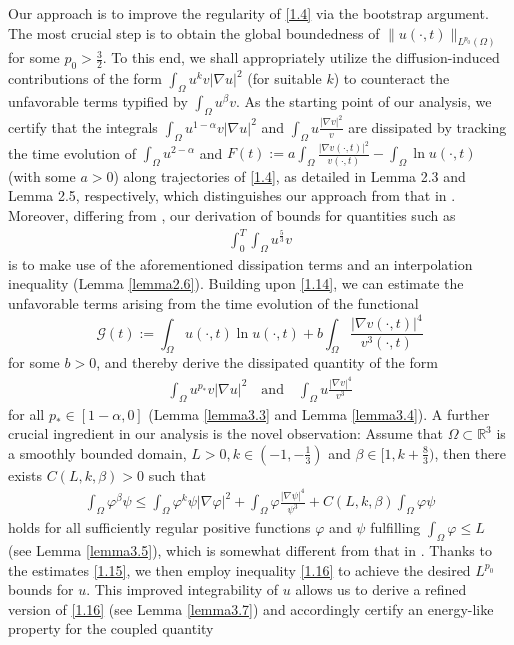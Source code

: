 \documentclass[12pt]{article}
\theoremstyle{plain}
\theoremstyle{definition}
\numberwithin{equation}{section}
\begin{document}
        Our approach is to improve the regularity of  \eqref{1.4} via the bootstrap argument. The most crucial step is to obtain the global boundedness of $\|u(\cdot,t)\|_{L^{p_0}(\Omega)}$ for some $p_0>\frac{3}{2}$. To this end,  we shall appropriately utilize the diffusion-induced contributions of the form $\int_{\Omega}u^{k}v|\nabla u|^2$ (for suitable $k$) to counteract the unfavorable terms typified by $\int_{\Omega}u^{\beta}v$.
    As the starting point of our analysis, we certify  that the integrals $\int_{\Omega}u^{1-\alpha}v|\nabla u|^2$ and $\int_{\Omega}u\frac{|\nabla v|^{2}}{v}$ are dissipated by tracking the
time evolution of $\int_{\Omega}u^{2-\alpha}$ and ${F}(t):=a\int_{\Omega} \frac{|\nabla v(\cdot,t)|^2}{v(\cdot,t)}-\int_{\Omega}\ln{u(\cdot,t)}$ (with some $a>0$) along trajectories of  \eqref{1.4}, as detailed in Lemma 2.3 and Lemma 2.5, respectively, which distinguishes our approach from that in \cite{LiG}. Moreover, differing from \cite{LiG,Wu}, our derivation of bounds for quantities such as
        \begin{align}\label{1.14}
        \int_0^{T}\int_\Omega u^{\frac{5}{3}}v
        \end{align}
         is to make use of the aforementioned dissipation terms
         and an interpolation inequality (Lemma \ref{lemma2.6}). Building upon \eqref{1.14}, we can estimate the
         unfavorable terms arising from the time evolution of the functional
         $$ \mathcal{ G}(t):=\int_{\Omega}u(\cdot,t)\ln{u}(\cdot,t)+b\int_{\Omega}\frac{|\nabla v(\cdot,t)|^4}{v^3(\cdot,t)}$$
        for some $b>0$, and thereby derive  the dissipated quantity of the form
        \begin{align}\label{1.15}
            \int_{\Omega}u^{p_*}v|\nabla u|^2  \quad \text{and}\quad  \int_{\Omega}u\frac{|\nabla v|^4}{v^3}
        \end{align}
         for all $p_*\in[1-\alpha, 0]$ (Lemma \ref{lemma3.3} and Lemma \ref{lemma3.4}). A further crucial ingredient in our analysis is the novel observation:
          Assume that $\Omega\subset \mathbb{R}^3$ is a  smoothly bounded domain, $L>0, k\in(-1,-\frac{1}{3})$ and
          $\beta\in[1,k+\frac{8}{3})$, then there exists  $C(L,k, \beta)>0$ such that
         \begin{align}\label{1.16}
             \int_{\Omega}\varphi^{\beta}\psi\leq  \int_{\Omega}\varphi^{k}\psi|\nabla \varphi|^2+\int_{\Omega}\varphi\frac{|\nabla \psi|^4}{\psi^3}+C(L,k, \beta)\int_{\Omega}\varphi \psi
         \end{align}
          holds for all sufficiently regular positive functions $\varphi$ and $\psi$ fulfilling $\int_{\Omega}\varphi\leq L$ (see Lemma \ref{lemma3.5}), which is somewhat different  from that in \cite{Wu}. Thanks to the estimates \eqref{1.15}, we then employ inequality \eqref{1.16} to achieve the desired $L^{p_0}$ bounds for $u$. This improved integrability of $u$ allows us to derive a refined version of \eqref{1.16} (see Lemma \ref{lemma3.7}) and accordingly  certify an energy-like property for the coupled quantity
\end{document}
